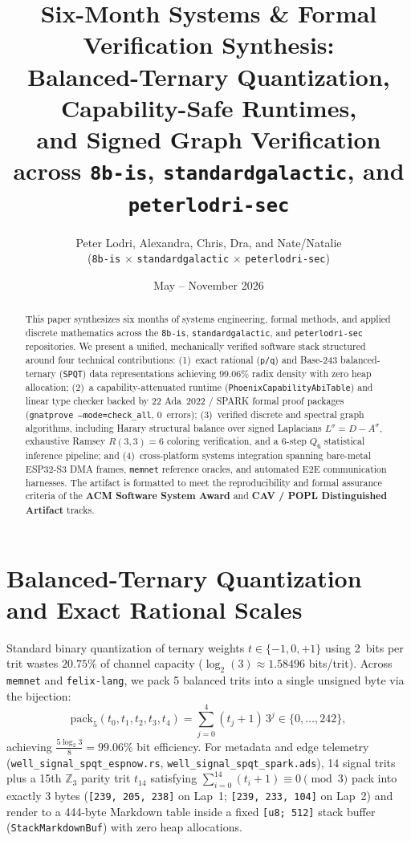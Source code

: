 \documentclass[11pt,a4paper]{article}
\title{Six-Month Systems \& Formal Verification Synthesis:\\
Balanced-Ternary Quantization, Capability-Safe Runtimes,\\
and Signed Graph Verification across \texttt{8b-is}, \texttt{standardgalactic}, and \texttt{peterlodri-sec}}
\author{Peter Lodri, Alexandra, Chris, Dra, and Nate/Natalie\\
(\texttt{8b-is} $\times$ \texttt{standardgalactic} $\times$ \texttt{peterlodri-sec})}
\date{May -- November 2026}
\begin{document}
\maketitle

\begin{abstract}
This paper synthesizes six months of systems engineering, formal methods, and applied discrete mathematics across the \texttt{8b-is}, \texttt{standardgalactic}, and \texttt{peterlodri-sec} repositories. We present a unified, mechanically verified software stack structured around four technical contributions: (1)~exact rational (\texttt{p/q}) and Base-243 balanced-ternary (\texttt{SPQT}) data representations achieving $99.06\%$ radix density with zero heap allocation; (2)~a capability-attenuated runtime (\texttt{PhoenixCapabilityAbiTable}) and linear type checker backed by 22 Ada~2022 / SPARK formal proof packages (\texttt{gnatprove --mode=check\_all}, 0~errors); (3)~verified discrete and spectral graph algorithms, including Harary structural balance over signed Laplacians $L^\sigma = D - A^\sigma$, exhaustive Ramsey $R(3,3)=6$ coloring verification, and a 6-step $Q_6$ statistical inference pipeline; and (4)~cross-platform systems integration spanning bare-metal ESP32-S3 DMA frames, \texttt{memnet} reference oracles, and automated E2E communication harnesses. The artifact is formatted to meet the reproducibility and formal assurance criteria of the \textbf{ACM Software System Award} and \textbf{CAV / POPL Distinguished Artifact} tracks.
\end{abstract}

\section{Balanced-Ternary Quantization and Exact Rational Scales}

Standard binary quantization of ternary weights $t \in \{-1, 0, +1\}$ using 2~bits per trit wastes $20.75\%$ of channel capacity ($\log_2(3) \approx 1.58496$ bits/trit). Across \texttt{memnet} and \texttt{felix-lang}, we pack 5 balanced trits into a single unsigned byte via the bijection:
\[
  \mathrm{pack}_5(t_0, t_1, t_2, t_3, t_4) = \sum_{j=0}^{4} (t_j + 1) \, 3^j \in \{0, \dots, 242\},
\]
achieving $\frac{5 \log_2 3}{8} = 99.06\%$ bit efficiency. For metadata and edge telemetry (\texttt{well\_signal\_spqt\_espnow.rs}, \texttt{well\_signal\_spqt\_spark.ads}), 14 signal trits plus a 15th $\mathbb{Z}_3$ parity trit $t_{14}$ satisfying $\sum_{i=0}^{14}(t_i + 1) \equiv 0 \pmod 3$ pack into exactly 3 bytes (\texttt{[239, 205, 238]} on Lap~1; \texttt{[239, 233, 104]} on Lap~2) and render to a 444-byte Markdown table inside a fixed \texttt{[u8; 512]} stack buffer (\texttt{StackMarkdownBuf}) with zero heap allocations.
\end{document}
